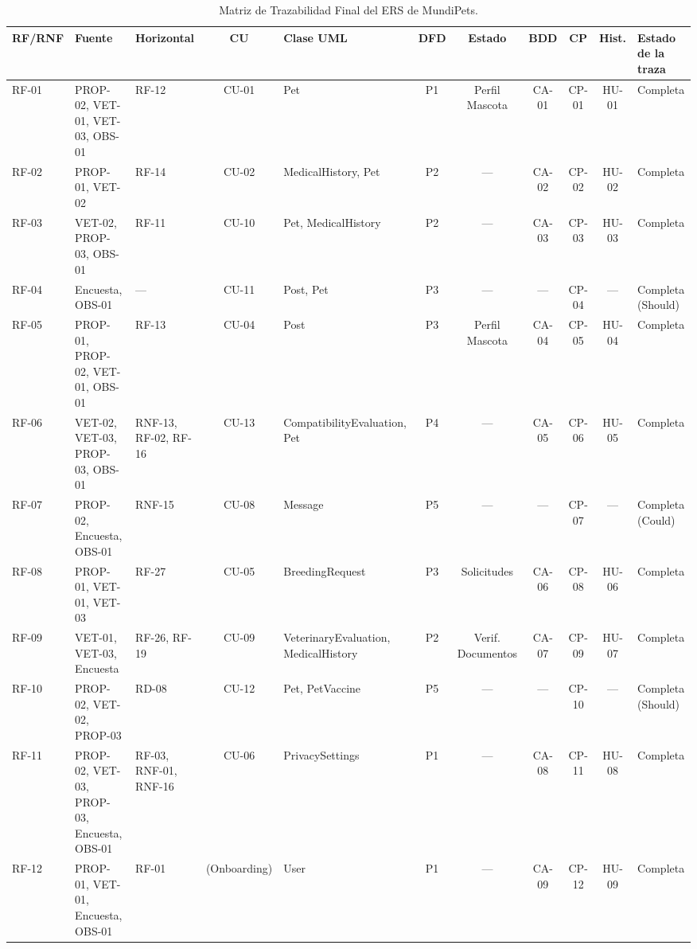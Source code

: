 \documentclass[journal,onecolumn]{IEEEtran}
\begin{document}
\begin{landscape}
\begin{table}[H]
	\centering
	\caption{Matriz de Trazabilidad Final del ERS de MundiPets.}
	\label{tab:matriz_final}
	\tiny
	\begin{tabularx}{\linewidth}{|l|X|X|c|X|c|c|c|c|c|X|}
		\hline
		\textbf{RF/RNF} & \textbf{Fuente} & \textbf{Horizontal} & \textbf{CU} & \textbf{Clase UML} & \textbf{DFD} & \textbf{Estado} & \textbf{BDD} & \textbf{CP} & \textbf{Hist.} & \textbf{Estado de la traza} \\
		\hline
		RF-01 & PROP-02, VET-01, VET-03, OBS-01 & RF-12 & CU-01 & Pet & P1 & Perfil Mascota & CA-01 & CP-01 & HU-01 & Completa \\ \hline
		RF-02 & PROP-01, VET-02 & RF-14 & CU-02 & MedicalHistory, Pet & P2 & --- & CA-02 & CP-02 & HU-02 & Completa \\ \hline
		RF-03 & VET-02, PROP-03, OBS-01 & RF-11 & CU-10 & Pet, MedicalHistory & P2 & --- & CA-03 & CP-03 & HU-03 & Completa \\ \hline
		RF-04 & Encuesta, OBS-01 & --- & CU-11 & Post, Pet & P3 & --- & --- & CP-04 & --- & Completa (Should) \\ \hline
		RF-05 & PROP-01, PROP-02, VET-01, OBS-01 & RF-13 & CU-04 & Post & P3 & Perfil Mascota & CA-04 & CP-05 & HU-04 & Completa \\ \hline
		RF-06 & VET-02, VET-03, PROP-03, OBS-01 & RNF-13, RF-02, RF-16 & CU-13 & CompatibilityEvaluation, Pet & P4 & --- & CA-05 & CP-06 & HU-05 & Completa \\ \hline
		RF-07 & PROP-02, Encuesta, OBS-01 & RNF-15 & CU-08 & Message & P5 & --- & --- & CP-07 & --- & Completa (Could) \\ \hline
		RF-08 & PROP-01, VET-01, VET-03 & RF-27 & CU-05 & BreedingRequest & P3 & Solicitudes & CA-06 & CP-08 & HU-06 & Completa \\ \hline
		RF-09 & VET-01, VET-03, Encuesta & RF-26, RF-19 & CU-09 & VeterinaryEvaluation, MedicalHistory & P2 & Verif. Documentos & CA-07 & CP-09 & HU-07 & Completa \\ \hline
		RF-10 & PROP-02, VET-02, PROP-03 & RD-08 & CU-12 & Pet, PetVaccine & P5 & --- & --- & CP-10 & --- & Completa (Should) \\ \hline
		RF-11 & PROP-02, VET-03, PROP-03, Encuesta, OBS-01 & RF-03, RNF-01, RNF-16 & CU-06 & PrivacySettings & P1 & --- & CA-08 & CP-11 & HU-08 & Completa \\ \hline
		RF-12 & PROP-01, VET-01, Encuesta, OBS-01 & RF-01 & (Onboarding) & User & P1 & --- & CA-09 & CP-12 & HU-09 & Completa \\ \hline

\end{tabularx}
\end{table}
\end{landscape}
\end{document}

